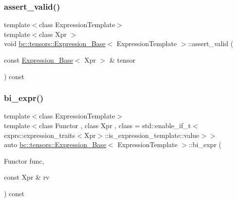 \mbox{\label{classbc_1_1tensors_1_1Expression__Base_a317eb91c2bfb04b05cae4c9b37243068}} 
\subsubsection{\texorpdfstring{assert\+\_\+valid()}{assert\_valid()}}
{\footnotesize\ttfamily template$<$class Expression\+Template$>$ \\
template$<$class Xpr $>$ \\
void \hyperlink{classbc_1_1tensors_1_1Expression__Base}{bc\+::tensors\+::\+Expression\+\_\+\+Base}$<$ Expression\+Template $>$\+::assert\+\_\+valid (\begin{DoxyParamCaption}\item[{const \hyperlink{classbc_1_1tensors_1_1Expression__Base}{Expression\+\_\+\+Base}$<$ Xpr $>$ \&}]{tensor }\end{DoxyParamCaption}) const\hspace{0.3cm}{\ttfamily [inline]}}

\mbox{\label{classbc_1_1tensors_1_1Expression__Base_a0e70418adb3e28d3f7ec5e8059d0fdbe}} 
\subsubsection{\texorpdfstring{bi\+\_\+expr()}{bi\_expr()}}
{\footnotesize\ttfamily template$<$class Expression\+Template$>$ \\
template$<$class Functor , class Xpr , class  = std\+::enable\+\_\+if\+\_\+t$<$			exprs\+::expression\+\_\+traits$<$\+Xpr$>$\+::is\+\_\+expression\+\_\+template\+::value$>$$>$ \\
auto \hyperlink{classbc_1_1tensors_1_1Expression__Base}{bc\+::tensors\+::\+Expression\+\_\+\+Base}$<$ Expression\+Template $>$\+::bi\+\_\+expr (\begin{DoxyParamCaption}\item[{Functor}]{func,  }\item[{const Xpr \&}]{rv }\end{DoxyParamCaption}) const\hspace{0.3cm}{\ttfamily [inline]}}

